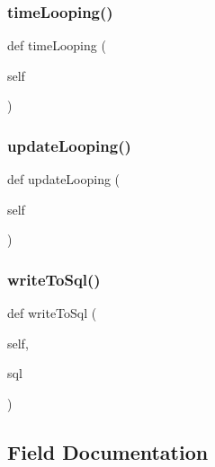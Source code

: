 \subsubsection{\texorpdfstring{time\+Looping()}{timeLooping()}}
{\footnotesize\ttfamily def time\+Looping (\begin{DoxyParamCaption}\item[{}]{self }\end{DoxyParamCaption})}

\hypertarget{classgame_1_1_player_1_1player_ac0084ae4f98be3d62cf166d2161f3234}{}\label{classgame_1_1_player_1_1player_ac0084ae4f98be3d62cf166d2161f3234} 
\subsubsection{\texorpdfstring{update\+Looping()}{updateLooping()}}
{\footnotesize\ttfamily def update\+Looping (\begin{DoxyParamCaption}\item[{}]{self }\end{DoxyParamCaption})}

\hypertarget{classgame_1_1_player_1_1player_a2aae31c5ae0c817b975b2dc4ae470e98}{}\label{classgame_1_1_player_1_1player_a2aae31c5ae0c817b975b2dc4ae470e98} 
\subsubsection{\texorpdfstring{write\+To\+Sql()}{writeToSql()}}
{\footnotesize\ttfamily def write\+To\+Sql (\begin{DoxyParamCaption}\item[{}]{self,  }\item[{}]{sql }\end{DoxyParamCaption})}



\subsection{Field Documentation}
\hypertarget{classgame_1_1_player_1_1player_a07f043935f9198f29c102e457f37e2a7}{}\label{classgame_1_1_player_1_1player_a07f043935f9198f29c102e457f37e2a7} 
